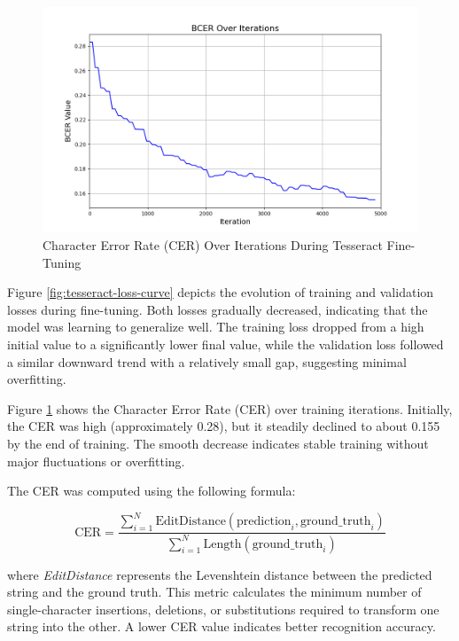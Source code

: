 \vspace{0.5cm}

\begin{figure}[H]
\centering
\includegraphics[width=0.90\linewidth]{Figures/Chapter 3/Tesseract_Fine_Tune_CER.png}
\caption{Character Error Rate (CER) Over Iterations During Tesseract Fine-Tuning}
\label{fig:tesseract-cer-curve}
\end{figure}

Figure \ref{fig:tesseract-loss-curve} depicts the evolution of training and validation losses during fine-tuning. Both losses gradually decreased, indicating that the model was learning to generalize well. The training loss dropped from a high initial value to a significantly lower final value, while the validation loss followed a similar downward trend with a relatively small gap, suggesting minimal overfitting.

Figure \ref{fig:tesseract-cer-curve} shows the Character Error Rate (CER) over training iterations. Initially, the CER was high (approximately 0.28), but it steadily declined to about 0.155 by the end of training. The smooth decrease indicates stable training without major fluctuations or overfitting.

The CER was computed using the following formula:

\begin{equation}
\text{CER} = \frac{\sum_{i=1}^{N} \text{EditDistance}(\text{prediction}_i, \text{ground\_truth}_i)}{\sum_{i=1}^{N} \text{Length}(\text{ground\_truth}_i)}
\end{equation}

where \textit{EditDistance} represents the Levenshtein distance between the predicted string and the ground truth. This metric calculates the minimum number of single-character insertions, deletions, or substitutions required to transform one string into the other. A lower CER value indicates better recognition accuracy.


